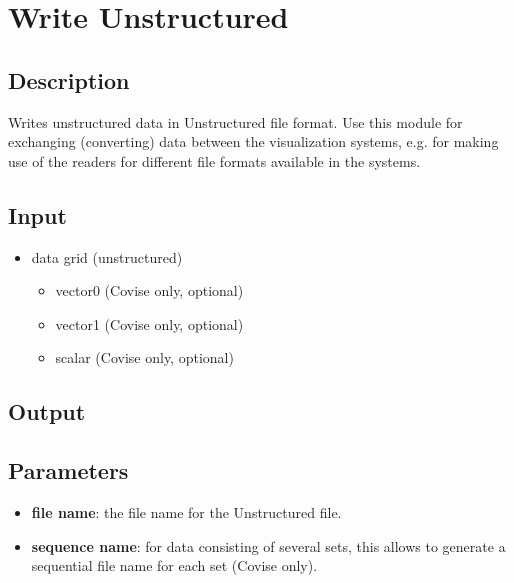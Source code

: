 \section{Write Unstructured}
\label{sec:write-unstructured}


\subsection{Description}
Writes unstructured data in Unstructured file format. Use this module for exchanging (converting) data between the visualization systems, e.g. for making use of the readers for different file formats available in the systems.


\subsection{Input}
\begin{itemize}
\item
  data grid (unstructured)
  \begin{itemize}
  \item
    vector0 (Covise only, optional)
  \item
    vector1 (Covise only, optional)
  \item
    scalar (Covise only, optional)
  \end{itemize}
\end{itemize}

\subsection{Output}


\subsection{Parameters}
\begin{itemize}

\item
  \textbf{file name}: the file name for the Unstructured file.

\item
  \textbf{sequence name}: for data consisting of several sets, this allows to generate a sequential file name for each set (Covise only).

\end{itemize}


